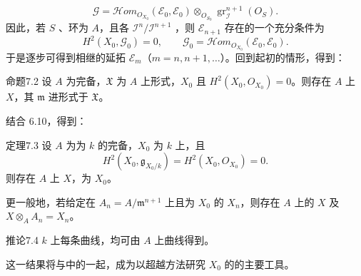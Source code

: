 \[\mathcal G=\mathcal H\!om_{O_{X_0}}(\mathcal E_0,\mathcal E_0)\otimes_{O_{S_0}}\operatorname{gr}^{n+1}_{\mathcal I}(O_S).\]
因此，若 $S$ 、环为 $A$，且各 $\mathcal I^n/\mathcal I^{n+1}$ ，则 $\mathcal E_{n+1}$ 存在的一个充分条件为
\[H^2(X_0,\mathcal G_0)=0,\qquad\mathcal G_0=\mathcal H\!om_{O_{X_0}}(\mathcal E_0,\mathcal E_0).\]
于是逐步可得到相继的延拓 $\mathcal E_m$（$m=n,n+1,\ldots$）。回到起初的情形，得到：
\begin{SGAresult}{命题}{7.2}
设 $A$ 为完备，$\mathfrak X$ 为 $A$ 上形式，$X_0$ 且 $H^2(X_0,O_{X_0})=0$。则存在 $A$ 上 $X$，其 $\mathfrak m$ 进形式于 $\mathfrak X$。
\end{SGAresult}
结合 6.10，得到：
\begin{SGAresult}{定理}{7.3}
设 $A$ 为为 $k$ 的完备，$X_0$ 为 $k$ 上，且
\[H^2(X_0,\mathfrak g_{X_0/k})=H^2(X_0,O_{X_0})=0.\]
则存在 $A$ 上 $X$，为 $X_0$。
\end{SGAresult}
更一般地，若给定在 $A_n=A/\mathfrak m^{n+1}$ 上且为 $X_0$ 的 $X_n$，则存在 $A$ 上的 $X$ 及 $X\otimes_A A_n=X_n$。
\begin{SGAresult}{推论}{7.4}
$k$ 上每条曲线，均可由 $A$ 上曲线得到。
\end{SGAresult}
这一结果将与中的一起，成为以超越方法研究 $X_0$ 的的主要工具。
